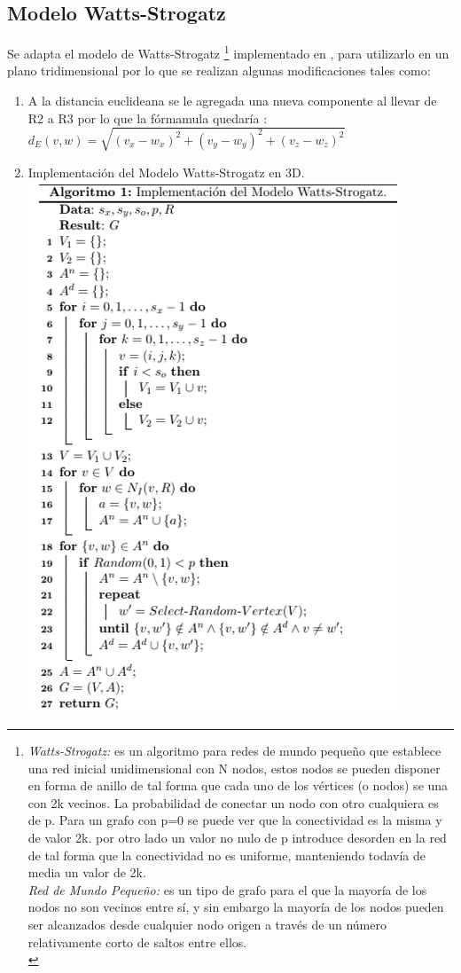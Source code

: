 \documentclass[12pt]{amsart}
\begin{document}
\subsection{Modelo Watts-Strogatz}

Se adapta  el modelo de Watts-Strogatz  \footnote{{\it Watts-Strogatz:} es un algoritmo para redes de mundo peque\~no que establece una red inicial unidimensional con N nodos, estos nodos se pueden disponer en forma de anillo de tal forma que cada uno de los v\'ertices (o nodos) se una con 2k vecinos. La probabilidad de conectar un nodo con otro cualquiera es de p. Para un grafo con p=0 se puede ver que la conectividad es la misma y de valor 2k. por otro lado un valor no nulo de p introduce desorden en la red de tal forma que la conectividad no es uniforme, manteniendo todavía de media un valor de 2k.\\{\it Red de Mundo Pequeño: }es un tipo de grafo para el que la mayoría de los nodos no son vecinos entre sí, y sin embargo la mayoría de los nodos pueden ser alcanzados desde cualquier nodo origen a través de un número relativamente corto de saltos entre ellos.\\} implementado en \cite{1}, para utilizarlo en un plano tridimensional por lo que se realizan algunas modificaciones tales como: 
\begin{enumerate}
\item A la distancia euclideana se le agregada una nueva componente al llevar de R2 a R3 por lo que la f\'ormamula quedar\'ia :  $d_E(v,w)= \sqrt{ (v_x-w_x)^2 + (v_y-w_y)^2 + (v_z-w_z)^2}  $\\
\item Implementaci\'on del Modelo Watts-Strogatz en 3D.\\
\includegraphics[scale=0.7]{img/Picture1.png}
\end{enumerate}
\end{document}
